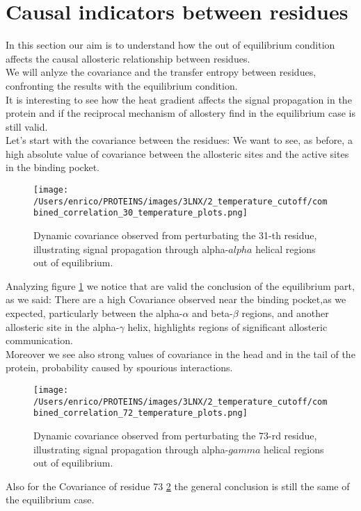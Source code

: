 \documentclass[English, Lau, oneside]{sapthesis}
\begin{document}
\newpage


\section{Causal indicators between residues}
\noindent In this section our aim is to understand how the out of equilibrium condition affects the causal allosteric relationship between residues.\\
We will anlyze the covariance and the transfer entropy between residues, confronting the results with the equilibrium condition.\\
It is interesting to see how the heat gradient affects the signal propagation in the protein and if the reciprocal mechanism of allostery find in the equilibrium case is still valid.\\
Let's start with the covariance between the residues: We want to see, as before, a high absolute value of covariance between the allosteric sites and the active sites in the binding pocket.\\


\begin{figure}[h!]
    \centering
    \texttt{[image: /Users/enrico/PROTEINS/images/3LNX/2\_temperature\_cutoff/combined\_correlation\_30\_temperature\_plots.png]}
    \caption{Dynamic covariance observed from perturbating the 31-th residue, illustrating signal propagation through alpha-$alpha$ helical regions out of equilibrium.}
    \label{fig:corr31_out}
\end{figure}
Analyzing figure \ref{fig:corr31_out} we notice that are valid the conclusion of the equilibrium part, as we said:
There are a high Covariance observed near the binding pocket,as we expected, particularly between the alpha-$\alpha$ and beta-$\beta$ regions, and another allosteric site in the alpha-$\gamma$ helix, highlights regions of significant allosteric communication.\\
Moreover we see also strong values of covariance in the head and in the tail of the protein, probability caused by spourious interactions. 
\newpage
\begin{figure}[h!]
    \centering
    \texttt{[image: /Users/enrico/PROTEINS/images/3LNX/2\_temperature\_cutoff/combined\_correlation\_72\_temperature\_plots.png]}
    \caption{Dynamic covariance observed from perturbating the 73-rd residue, illustrating signal propagation through alpha-$gamma$ helical regions out of equilibrium.}
    \label{fig:corr73_out}
\end{figure}
Also for the Covariance of residue 73 \ref{fig:corr73_out} the general conclusion is still the same of the equilibrium case.\\
\end{document}
